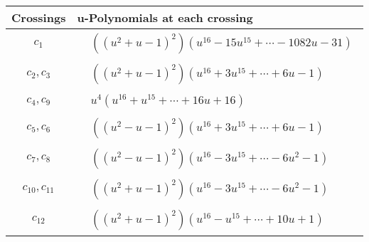 \documentclass[1p]{elsarticle_modified}
\theoremstyle{definition}
\begin{document}
\begin{tabular}{m{50pt}|m{274pt}}
Crossings & \hspace{64pt}u-Polynomials at each crossing \\
\hline $$\begin{aligned}c_{1}\end{aligned}$$&$\begin{aligned}
&((u^2+u-1)^2)(u^{16}-15 u^{15}+\cdots-1082 u-31)
\end{aligned}$\\
\hline $$\begin{aligned}c_{2},c_{3}\end{aligned}$$&$\begin{aligned}
&((u^2+u-1)^2)(u^{16}+3 u^{15}+\cdots+6 u-1)
\end{aligned}$\\
\hline $$\begin{aligned}c_{4},c_{9}\end{aligned}$$&$\begin{aligned}
&u^4(u^{16}+u^{15}+\cdots+16 u+16)
\end{aligned}$\\
\hline $$\begin{aligned}c_{5},c_{6}\end{aligned}$$&$\begin{aligned}
&((u^2- u-1)^2)(u^{16}+3 u^{15}+\cdots+6 u-1)
\end{aligned}$\\
\hline $$\begin{aligned}c_{7},c_{8}\end{aligned}$$&$\begin{aligned}
&((u^2- u-1)^2)(u^{16}-3 u^{15}+\cdots-6 u^2-1)
\end{aligned}$\\
\hline $$\begin{aligned}c_{10},c_{11}\end{aligned}$$&$\begin{aligned}
&((u^2+u-1)^2)(u^{16}-3 u^{15}+\cdots-6 u^2-1)
\end{aligned}$\\
\hline $$\begin{aligned}c_{12}\end{aligned}$$&$\begin{aligned}
&((u^2+u-1)^2)(u^{16}- u^{15}+\cdots+10 u+1)
\end{aligned}$\\
\hline
\end{tabular}\newpage\renewcommand{\arraystretch}{1}
\end{document}
